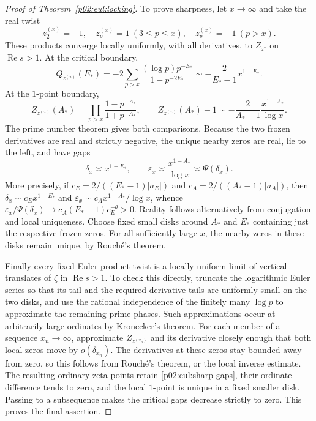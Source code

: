 \documentclass[11pt,letterpaper]{article}
\theoremstyle{definition}
\theoremstyle{remark}
\newcommand{\eps}{\varepsilon}
\renewcommand{\Re}{\operatorname{Re}}
\newcommand{\1}{\mathbf 1}
\begin{document}
\begin{proof}[Proof of Theorem~\ref{p02:eul:locking}]
To prove sharpness, let $x\to\infty$ and take the real twist
\[
 z^{(x)}_2=-1,\quad z^{(x)}_p=1\ (3\le p\le x),\quad
 z^{(x)}_p=-1\ (p>x).
\]
These products converge locally uniformly, with all derivatives, to
$Z_{z^*}$ on $\Re s>1$. At the critical boundary,
\begin{equation}\label{p02:eul:sharp-critical}
 Q_{z^{(x)}}(E_*)
 =-2\sum_{p>x}\frac{(\log p)p^{-E_*}}{1-p^{-2E_*}}
 \sim-\frac{2}{E_*-1}x^{1-E_*}.
\end{equation}
At the $1$-point boundary,
\begin{equation}\label{p02:eul:sharp-one}
 Z_{z^{(x)}}(A_*)
 =\prod_{p>x}\frac{1-p^{-A_*}}{1+p^{-A_*}},\qquad
 Z_{z^{(x)}}(A_*)-1\sim-
              \frac{2}{A_*-1}\frac{x^{1-A_*}}{\log x}.
\end{equation}
The prime number theorem gives both comparisons. Because the two
frozen derivatives are real and strictly negative, the unique nearby
zeros are real, lie to the left, and have gaps
\begin{equation}\label{p02:eul:sharp-gaps}
 \delta_x\asymp x^{1-E_*},\qquad
 \eps_x\asymp\frac{x^{1-A_*}}{\log x}
            \asymp\Psi(\delta_x).
\end{equation}
More precisely, if
$c_E=2/((E_*-1)|a_E|)$ and
$c_A=2/((A_*-1)|a_A|)$, then
$\delta_x\sim c_Ex^{1-E_*}$ and
$\eps_x\sim c_Ax^{1-A_*}/\log x$, whence
$\eps_x/\Psi(\delta_x)\to c_A(E_*-1)c_E^{-\theta}>0$.
Reality follows alternatively from conjugation and local uniqueness.
Choose fixed small disks around $A_*$ and $E_*$ containing just the
respective frozen zeros. For all sufficiently large $x$, the nearby
zeros in these disks remain unique, by Rouch\'e's theorem.

Finally every fixed Euler-product twist is a locally uniform limit
of vertical translates of $\zeta$ in $\Re s>1$. To check this
directly, truncate the logarithmic Euler series so that its tail and
the required derivative tails are uniformly small on the two disks,
and use the rational independence of the finitely many $\log p$
to approximate the remaining prime phases. Such approximations occur
at arbitrarily large ordinates by Kronecker's theorem. For each member
of a sequence $x_n\to\infty$, approximate $Z_{z^{(x_n)}}$ and its
derivative closely enough that both local zeros move by $o(\delta_{x_n})$.
The derivatives at these zeros stay bounded away from zero, so this
follows from Rouch\'e's theorem, or the local inverse estimate.
The resulting ordinary-zeta points retain \eqref{p02:eul:sharp-gaps},
their ordinate difference tends to zero, and the local $1$-point is
unique in a fixed smaller disk. Passing to a subsequence makes the
critical gaps decrease strictly to zero. This proves the final assertion.
\end{proof}
\end{document}
